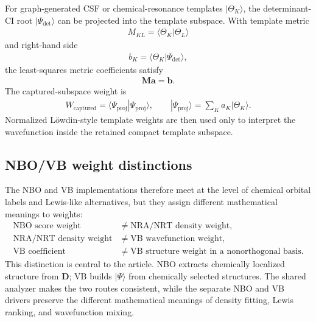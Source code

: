 \documentclass[11pt]{article}
\newcommand{\dens}{\mathbf{D}}
\begin{document}
For graph-generated CSF or chemical-resonance templates $|\Theta_K\rangle$, the determinant-CI root $|\Psi_{\mathrm{det}}\rangle$ can be projected into the template subspace.  With template metric
\begin{equation}
\begin{aligned}
	M_{KL}=\langle \Theta_K|\Theta_L\rangle
\end{aligned}
\end{equation}
and right-hand side
\begin{equation}
\begin{aligned}
	b_K=\langle \Theta_K|\Psi_{\mathrm{det}}\rangle,
\end{aligned}
\end{equation}
the least-squares metric coefficients satisfy
\begin{equation}
\begin{aligned}
	\mathbf{M}\mathbf{a}=\mathbf{b}.
\end{aligned}
\end{equation}
The captured-subspace weight is
\begin{equation}
\begin{aligned}
	W_{\mathrm{captured}}
	= \langle \Psi_{\mathrm{proj}}|\Psi_{\mathrm{proj}}\rangle,
	\qquad
	|\Psi_{\mathrm{proj}}\rangle = \sum_K a_K |\Theta_K\rangle.
\end{aligned}
\end{equation}
Normalized L\"owdin-style template weights are then used only to interpret the wavefunction inside the retained compact template subspace.

\subsection{NBO/VB weight distinctions}

The NBO and VB implementations therefore meet at the level of chemical orbital labels and Lewis-like alternatives, but they assign different mathematical meanings to weights:
\begin{equation}
\begin{aligned}
	\text{NBO score weight} &\neq \text{NRA/NRT density weight}, \\
	\text{NRA/NRT density weight} &\neq \text{VB wavefunction weight}, \\
	\text{VB coefficient} &\neq \text{VB structure weight in a nonorthogonal basis}.
\end{aligned}
\end{equation}
This distinction is central to the article.  NBO extracts chemically localized structure from $\dens$; VB builds $|\Psi\rangle$ from chemically selected structures.  The shared analyzer makes the two routes consistent, while the separate NBO and VB drivers preserve the different mathematical meanings of density fitting, Lewis ranking, and wavefunction mixing.
\end{document}
